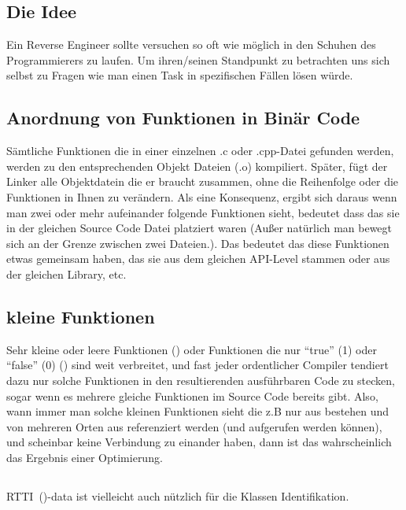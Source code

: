 
\subsection{Die Idee}  

Ein Reverse Engineer sollte versuchen so oft wie m\"oglich in den Schuhen des
Programmierers zu laufen. Um ihren/seinen Standpunkt zu betrachten uns sich
selbst zu Fragen wie man einen Task in spezifischen F\"allen l\"osen w\"urde.

\subsection{Anordnung von Funktionen in Bin\"ar Code}  

S\"amtliche Funktionen die in einer einzelnen .c oder .cpp-Datei gefunden werden,
werden zu den entsprechenden Objekt Dateien (.o) kompiliert. Sp\"ater, f\"ugt
der Linker alle Objektdatein die er braucht zusammen, ohne die Reihenfolge oder
die Funktionen in Ihnen zu ver\"andern. Als eine Konsequenz, ergibt sich daraus
wenn man zwei oder mehr aufeinander folgende Funktionen sieht, bedeutet dass das
sie in der gleichen Source Code Datei platziert waren (Außer nat\"urlich man bewegt
sich an der Grenze zwischen zwei Dateien.). Das bedeutet das diese Funktionen etwas
gemeinsam haben, das sie aus dem gleichen \ac{API}-Level stammen oder aus der
gleichen Library, etc.

\subsection{kleine Funktionen} 

Sehr kleine oder leere Funktionen  ()
oder Funktionen die nur ``true'' (1) oder ``false'' (0) () sind weit verbreitet,
und fast jeder ordentlicher Compiler tendiert dazu nur solche Funktionen in den resultierenden ausf\"uhrbaren Code zu stecken,
sogar wenn es mehrere gleiche Funktionen im Source Code bereits gibt. 
Also, wann immer man solche kleinen Funktionen sieht die z.B nur aus  bestehen und von mehreren 
Orten aus referenziert werden (und aufgerufen werden k\"onnen), und scheinbar keine Verbindung zu einander haben, dann 
ist das wahrscheinlich das Ergebnis einer Optimierung. 

\subsection{\Cpp}

\ac{RTTI}~()-data ist vielleicht auch n\"utzlich f\"ur die \Cpp Klassen Identifikation.
